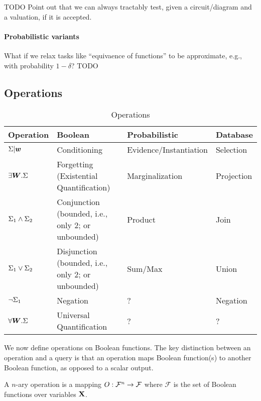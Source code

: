 TODO Point out that we can always tractably test, given a circuit/diagram and a
valuation, if it is accepted.

\paragraph*{Probabilistic variants}
What if we relax tasks like ``equivaence of functions'' to be approximate, e.g., with probability $1-\delta$? TODO

\subsection{Operations}
\label{sec:operations}


\begin{table}[]
\centering
\begin{tabular}{@{}llll@{}}
\toprule
\textbf{Operation} & \textbf{Boolean}         & \textbf{Probabilistic} & \textbf{Database} \\ \midrule
$\Sigma | \bm{w}$        & Conditioning             & Evidence/Instantiation & Selection         \\
$\exists \bm{W}. \Sigma$                   & Forgetting (Existential Quantification)               & Marginalization        & Projection        \\
  $\Sigma_1 \wedge \Sigma_2$                     & Conjunction (bounded,
  i.e., only 2; or unbounded)             & Product                & Join              \\
  $\Sigma_1 \vee \Sigma_2$                  & Disjunction (bounded, i.e.,
  only 2; or unbounded)             & Sum/Max                & Union             \\
$\neg \Sigma_1$                   & Negation                 & ?                      & Negation          \\
$\forall \bm{W}. \Sigma$                     & Universal Quantification & ?                      &   ?                \\ \bottomrule
\end{tabular}
\label{tbl:operations}
\caption{Operations}
\end{table}

We now define operations on Boolean functions. The key distinction between an operation and a query is that an operation maps Boolean function(s) to another Boolean function, as opposed to a scalar output.

\begin{definition}[Operation]
    A $n$-ary operation is a mapping $O: \mathcal{F}^n \to \mathcal{F}$ where $\mathcal{F}$ is the set of Boolean functions over variables $\mathbf{X}$.
\end{definition}

